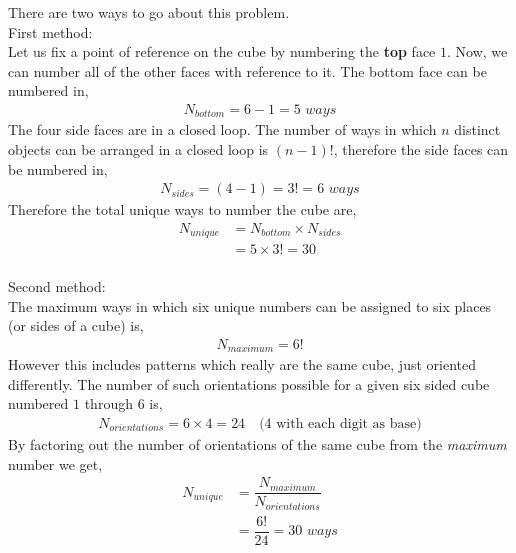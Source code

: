 \begin{solution}[\halfpage]
  There are two ways to go about this problem.\\
  First method:\\
  Let us fix a point of reference on the cube by numbering the \textbf{top}
  face $1$. Now, we can number all of the other faces with reference to it.
  The bottom face can be numbered in,
  \begin{align}
     N_{bottom} = 6 - 1 = 5 \textit{ ways}
  \end{align}
  The four side faces are in a closed loop. The number of ways in which
  $n$ distinct objects can be arranged in a closed loop is $(n-1)!$, 
  therefore the side faces can be numbered in,
  \begin{align}
     N_{sides} = (4 - 1) = 3! = 6 \textit{ ways}
  \end{align}
  Therefore the total unique ways to number the cube are,
  \begin{align}
    N_{unique} &= N_{bottom} \times N_{sides} \\
               &= 5 \times 3! = 30 
  \end{align}
  \\
  Second method:\\
  The maximum ways in which six unique numbers can be assigned to six
  places (or sides of a cube) is,
  \begin{align}
    N_{maximum} = 6! 
  \end{align}
  However this includes patterns which really are the same cube, just
  oriented differently. The number of such orientations possible for 
  a given six sided cube numbered $1$ through $6$ is,
  \begin{align}
  N_{orientations} = 6 \times 4 = 24 \quad\text{(4 with each digit as base)}
  \end{align}
  By factoring out the number of orientations of the same cube from the 
  \textit{maximum} number we get,
  \begin{align}
    N_{unique} &= \dfrac{N_{maximum}}{N_{orientations}} \\
               &= \dfrac{6!}{24} = 30 \textit{ ways}
  \end{align}   
\end{solution}


